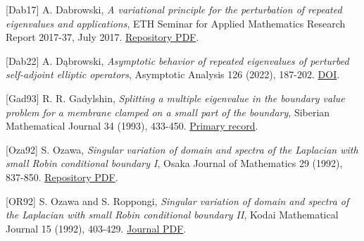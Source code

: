 \documentclass[11pt]{article}
\begin{document}
{[}Dab17{]} A. Dabrowski, \emph{A variational principle for the
perturbation of repeated eigenvalues and applications}, ETH Seminar for
Applied Mathematics Research Report 2017-37, July 2017.
\href{https://www.sam.math.ethz.ch/sam_reports/reports_final/reports2017/2017-37.pdf}{Repository
PDF}.

{[}Dab22{]} A. D\k{a}browski, \emph{Asymptotic behavior of repeated
eigenvalues of perturbed self-adjoint elliptic operators}, Asymptotic
Analysis 126 (2022), 187-202.
\href{https://doi.org/10.3233/ASY-201669}{DOI}.

{[}Gad93{]} R. R. Gadyl\textquotesingle shin, \emph{Splitting a multiple
eigenvalue in the boundary value problem for a membrane clamped on a
small part of the boundary}, Siberian Mathematical Journal 34 (1993),
433-450.
\href{https://www.mathnet.ru/php/archive.phtml?jrnid=smj&option_lang=eng&paperid=1651&wshow=paper}{Primary
record}.

{[}Oza92{]} S. Ozawa, \emph{Singular variation of domain and spectra of
the Laplacian with small Robin conditional boundary I}, Osaka Journal of
Mathematics 29 (1992), 837-850.
\href{https://ir.library.osaka-u.ac.jp/repo/ouka/all/7188/ojm29_04_10.pdf}{Repository
PDF}.

{[}OR92{]} S. Ozawa and S. Roppongi, \emph{Singular variation of domain
and spectra of the Laplacian with small Robin conditional boundary II},
Kodai Mathematical Journal 15 (1992), 403-429.
\href{https://www.jstage.jst.go.jp/article/kodaimath1978/15/3/15_3_403/_pdf}{Journal
PDF}.
\end{document}
